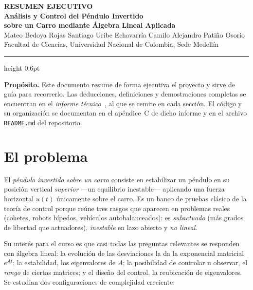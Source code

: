 \documentclass[11pt,letterpaper]{article}
\begin{document}
\begin{center}
    {\footnotesize\bfseries\color{acento2} RESUMEN EJECUTIVO}\\[0.4em]
    {\LARGE\bfseries Análisis y Control del Péndulo Invertido \\[0.15em]
     sobre un Carro mediante Álgebra Lineal Aplicada}\\[0.6em]
    {\normalsize Mateo Bedoya Rojas \quad\textbullet\quad Santiago Uribe Echavarría \quad\textbullet\quad Camilo Alejandro Patiño Osorio}\\[0.3em]
    {\footnotesize Facultad de Ciencias, Universidad Nacional de Colombia, Sede Medellín}
\end{center}
\vspace{0.2em}
\hrule height 0.6pt
\vspace{0.8em}

\noindent
\begin{clave}
\small
\textbf{Propósito.} Este documento resume de forma ejecutiva el proyecto y sirve
de guía para recorrerlo. Las deducciones, definiciones y demostraciones
completas se encuentran en el \emph{informe técnico}~\cite{tecnico}, al que se
remite en cada sección. El código y su organización se documentan en el
apéndice~C de dicho informe y en el archivo \texttt{README.md} del
repositorio.
\end{clave}

\section{El problema}

El \emph{péndulo invertido sobre un carro} consiste en estabilizar un péndulo en
su posición vertical \emph{superior} ---un equilibrio inestable--- aplicando una
fuerza horizontal $u(t)$ únicamente sobre el carro. Es un banco de pruebas
clásico de la teoría de control porque reúne tres rasgos que aparecen en
problemas reales (cohetes, robots bípedos, vehículos autobalanceados):
es \emph{subactuado} (más grados de libertad que actuadores),
\emph{inestable} en lazo abierto y \emph{no lineal}.

Su interés para el curso es que casi todas las preguntas relevantes se responden
con álgebra lineal: la evolución de las desviaciones la da la exponencial
matricial $e^{At}$; la estabilidad, los eigenvalores de $A$; la posibilidad de
controlar u observar, el \emph{rango} de ciertas matrices; y el diseño del
control, la reubicación de eigenvalores. Se estudian dos configuraciones de
complejidad creciente:
\end{document}
